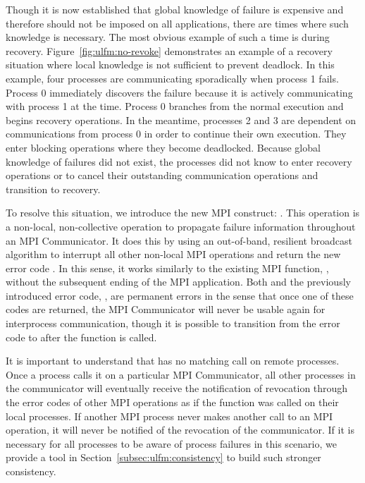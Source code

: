 Though it is now established that global knowledge of failure is expensive and
therefore should not be imposed on all applications, there are times where such
knowledge is necessary. The most obvious example of such a time is during
recovery. Figure~\ref{fig:ulfm:no-revoke} demonstrates an example of a recovery
situation where local knowledge is not sufficient to prevent deadlock. In this
example, four processes are communicating sporadically when process 1 fails.
Process 0 immediately discovers the failure because it is actively communicating
with process 1 at the time. Process 0 branches from the normal execution and
begins recovery operations. In the meantime, processes 2 and 3 are dependent on
communications from process 0 in order to continue their own execution. They
enter blocking operations where they become deadlocked. Because global knowledge 
of failures did not exist, the processes did not know to enter recovery 
operations or to cancel their outstanding communication operations and 
transition to recovery.

To resolve this situation, we introduce the new MPI construct:
. This operation is a non-local, non-collective
operation to propagate failure information throughout an MPI Communicator. It
does this by using an out-of-band, resilient broadcast algorithm to interrupt 
all other non-local MPI operations and return the new error code
. In this sense, it works similarly to the existing 
MPI function, , without the subsequent ending of the MPI
application. Both  and the previously introduced 
error code, , are permanent errors in the sense that once
one of these codes are returned, the MPI Communicator will never be usable again
for interprocess communication, though it is possible to transition from the
error code  to  after
the function  is called.

It is important to understand that  has no matching
call on remote processes. Once a process calls it on a particular MPI
Communicator, all other processes in the communicator will eventually receive
the notification of revocation through the error codes of other MPI operations
as if the function was called on their local processes. If another MPI process
never makes another call to an MPI operation, it will never be notified of the
revocation of the communicator. If it is necessary for all processes to be aware 
of process failures in this scenario, we provide a tool in 
Section~\ref{subsec:ulfm:consistency} to build such stronger consistency.

